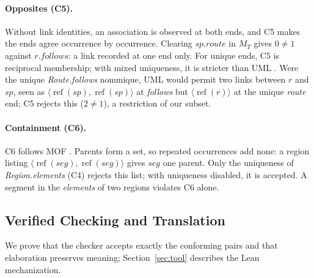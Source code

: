 \paragraph{Opposites (C5).}
Without link identities, an association is observed at both ends, and C5 makes
the ends agree occurrence by occurrence. Clearing $\mathit{sp}.\mathit{route}$
in $M_T$ gives $0\neq1$ against $r.\mathit{follows}$: a link recorded at one end
only. For unique ends, C5 is reciprocal membership; with mixed uniqueness, it is
stricter than UML \cite[\S11.5.3.1]{omg_uml_25}. Were the unique
\emph{Route.follows} nonunique, UML would permit two links between $r$ and
$\mathit{sp}$, seen as
$\langle\operatorname{ref}(\mathit{sp}),\operatorname{ref}(\mathit{sp})\rangle$
at \emph{follows} but $\langle\operatorname{ref}(r)\rangle$ at the unique
\emph{route} end; C5 rejects this ($2\neq1$), a restriction of our subset.

\paragraph{Containment (C6).}
C6 follows MOF \cite[\S12.5.5]{omg_mof_251}. Parents form a set, so repeated
occurrences add none: a region listing
$\langle\operatorname{ref}(\mathit{seg}),\operatorname{ref}(\mathit{seg})\rangle$
gives $\mathit{seg}$ one parent. Only the uniqueness of \emph{Region.elements}
(C4) rejects this list; with uniqueness disabled, it is accepted. A segment in the
\emph{elements} of two regions violates C6 alone.

\subsection{Verified Checking and Translation}\label{sec:guarantees}
We prove that the checker accepts exactly the conforming pairs and that
elaboration preserves meaning; Section~\ref{sec:tool} describes the Lean
mechanization.

